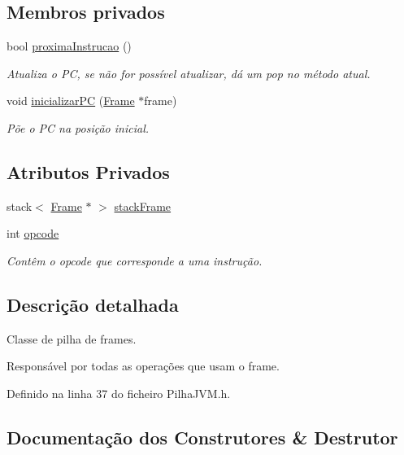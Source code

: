 \subsection*{Membros privados}
\begin{DoxyCompactItemize}
\item 
bool \hyperlink{classPilhaJVM_a914a4707e58e23e8913fcdc0c53f8c5c}{proxima\+Instrucao} ()
\begin{DoxyCompactList}\small\item\em Atualiza o PC, se não for possível atualizar, dá um pop no método atual. \end{DoxyCompactList}\item 
void \hyperlink{classPilhaJVM_a08adb78983b512cf3d97becfa2e9a5f0}{inicializar\+PC} (\hyperlink{PilhaJVM_8h_acc380914b41a084dcc8e4b38fb200145}{Frame} $\ast$frame)
\begin{DoxyCompactList}\small\item\em Põe o PC na posição inicial. \end{DoxyCompactList}\end{DoxyCompactItemize}
\subsection*{Atributos Privados}
\begin{DoxyCompactItemize}
\item 
stack$<$ \hyperlink{PilhaJVM_8h_acc380914b41a084dcc8e4b38fb200145}{Frame} $\ast$ $>$ \hyperlink{classPilhaJVM_a4d70c8b3d6fbddb38e943dc8b1a00c2d}{stack\+Frame}
\item 
int \hyperlink{classPilhaJVM_a90e6f9da43b72798ea0331c57b72af09}{opcode}
\begin{DoxyCompactList}\small\item\em Contêm o opcode que corresponde a uma instrução. \end{DoxyCompactList}\end{DoxyCompactItemize}


\subsection{Descrição detalhada}
Classe de pilha de frames. 

Responsável por todas as operações que usam o frame. 

Definido na linha 37 do ficheiro Pilha\+J\+V\+M.\+h.



\subsection{Documentação dos Construtores \& Destrutor}
\mbox{\label{classPilhaJVM_a9acc6081073376a6f658c9dcfd3f6011}} 
